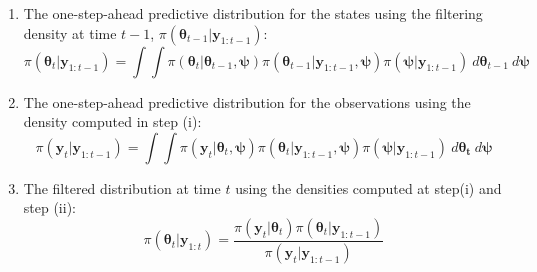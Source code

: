 \documentclass[
  12pt,
]{book}
\theoremstyle{break}
\theoremstyle{nonumberplain}
\begin{document}
\begin{enumerate}[label=(\roman*)]
\item The one-step-ahead predictive distribution for the states using the filtering density at time $t-1$, $\pi(\boldsymbol{\theta}_{t-1}|\boldsymbol{y}_{1:t-1})$: \[\pi(\boldsymbol{\theta}_{t}| \boldsymbol{y}_{1:t-1})=\int\int \pi(\boldsymbol{\theta}_{t}|\boldsymbol{\theta}_{t-1},\boldsymbol{\psi}) \pi(\boldsymbol{\theta}_{t-1}|\boldsymbol{y}_{1:t-1},\boldsymbol{\psi})\pi(\boldsymbol{\psi}|\boldsymbol{y}_{1:t-1}) \ d\boldsymbol{\theta}_{t-1}\ d\boldsymbol{\psi} \]
\item The one-step-ahead predictive distribution for the observations using the density computed in step (i): \[\pi(\boldsymbol{y}_{t}|\boldsymbol{y}_{1:t-1})=\int\int \pi(\boldsymbol{y}_{t}|\boldsymbol{\theta}_{t},\boldsymbol{\psi}) \pi(\boldsymbol{\theta}_{t}|\boldsymbol{y}_{1:t-1},\boldsymbol{\psi})\pi(\boldsymbol{\psi}|\boldsymbol{y}_{1:t-1})  \ d\boldsymbol{\theta_{t}}\  d\boldsymbol{\psi}\]
\item The filtered distribution at time $t$ using the densities computed at step(i) and step (ii):  \[\pi(\boldsymbol{\theta}_{t}|\boldsymbol{y}_{1:t})=\frac{\pi(\boldsymbol{y}_{t}|\boldsymbol{\theta}_{t})\pi(\boldsymbol{\theta}_{t}|\boldsymbol{y}_{1:t-1})}{\pi(\boldsymbol{y}_{t}|\boldsymbol{y}_{1:t-1})}\]
\end{enumerate}
\end{document}

